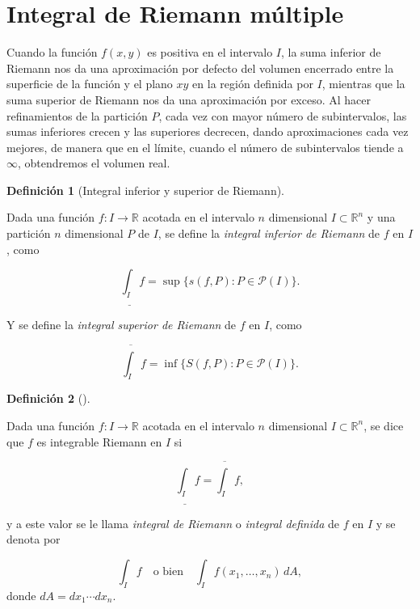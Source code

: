 \documentclass[
  a4paper,
]{scrreport}
\theoremstyle{definition}
\theoremstyle{definition}
\theoremstyle{definition}
\newtheorem{definition}{Definición}[chapter]
\theoremstyle{plain}
\theoremstyle{plain}
\theoremstyle{plain}
\theoremstyle{remark}
\begin{document}
\section{Integral de Riemann
múltiple}\label{integral-de-riemann-muxfaltiple}

Cuando la función \(f(x,y)\) es positiva en el intervalo \(I\), la suma
inferior de Riemann nos da una aproximación por defecto del volumen
encerrado entre la superficie de la función y el plano \(xy\) en la
región definida por \(I\), mientras que la suma superior de Riemann nos
da una aproximación por exceso. Al hacer refinamientos de la partición
\(P\), cada vez con mayor número de subintervalos, las sumas inferiores
crecen y las superiores decrecen, dando aproximaciones cada vez mejores,
de manera que en el límite, cuando el número de subintervalos tiende a
\(\infty\), obtendremos el volumen real.

\begin{definition}[Integral inferior y superior de
Riemann]\protect\hypertarget{def-integral-inferior-superior-riemann-multiple}{}\label{def-integral-inferior-superior-riemann-multiple}

Dada una función \(f:I\to \mathbb{R}\) acotada en el intervalo \(n\)
dimensional \(I\subset \mathbb{R}^n\) y una partición \(n\) dimensional
\(P\) de \(I\), se define la \emph{integral inferior de Riemann} de
\(f\) en \(I\), como

\[
\underline{\int_I} f = \sup\{s(f,P): P\in\mathcal{P}(I)\}.
\]

Y se define la \emph{integral superior de Riemann} de \(f\) en \(I\),
como

\[
\overline{\int_I} f = \inf\{S(f,P): P\in\mathcal{P}(I)\}.
\]

\end{definition}

\begin{definition}[]\protect\hypertarget{def-integral-riemann-n-dimensional}{}\label{def-integral-riemann-n-dimensional}

Dada una función \(f:I\to \mathbb{R}\) acotada en el intervalo \(n\)
dimensional \(I\subset \mathbb{R}^n\), se dice que \(f\) es integrable
Riemann en \(I\) si

\[
\underline{\int_I} f = \overline{\int_I}f,
\]

y a este valor se le llama \emph{integral de Riemann} o \emph{integral
definida} de \(f\) en \(I\) y se denota por

\[
\int_I f \quad \mbox{o bien} \quad \int_I f(x_1,\ldots,x_n)\,dA,
\] donde \(dA = dx_1\cdots dx_n\).

\end{definition}
\end{document}
